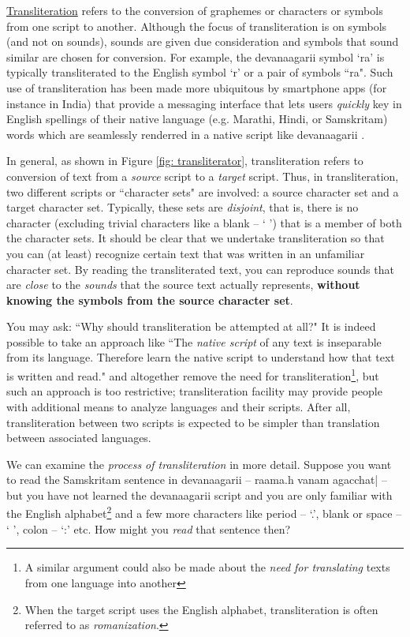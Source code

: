 \documentclass[a4paper, 12pt]{article}
\newcommand \sans[1]{
    \textsanskrit{#1}
}
\begin{document}
\href{https://en.m.wikipedia.org/wiki/Transliteration}{Transliteration} refers to the conversion of graphemes or characters or symbols from one script to another. Although the focus of transliteration is on symbols (and not on sounds), sounds are given due consideration and symbols that sound similar are chosen for conversion. For example, the \sans{devanaagarii} symbol \sans{`ra'} is typically transliterated to the English symbol `r' or a pair of symbols ``ra". Such use of transliteration has been made more ubiquitous by smartphone apps (for instance in India) that provide a messaging interface that lets users \emph{quickly} key in English spellings of their native language (e.g. Marathi, Hindi, or Samskritam) words which are seamlessly renderred in a native script like \sans{devanaagarii}. 

In general, as shown in Figure \ref{fig: transliterator}, transliteration refers to conversion of text from a \emph{source} script to a \emph{target} script. Thus, in transliteration, two different scripts or ``character sets" are involved: a source character set and a target character set. Typically, these sets are \emph{disjoint}, that is, there is no character (excluding trivial characters like a blank -- ` ') that is a member of both the character sets. It should be clear that we undertake transliteration so that you can (at least) recognize certain text that was written in an unfamiliar character set. By reading the transliterated text, you can reproduce sounds that are \emph{close} to the \emph{sounds} that the source text actually represents, \textbf{without knowing the symbols from the source character set}. 

You may ask: ``Why should transliteration be attempted at all?" It is indeed possible to take an approach like ``The \emph{native script} of any text is inseparable from its language. Therefore learn the native script to understand how that text is written and read." and altogether remove the need for transliteration\footnote{A similar argument could also be made about the \emph{need for translating} texts from one language into another}, but such an approach is too restrictive; transliteration facility may provide people with additional means to analyze languages and their scripts. After all, transliteration between two scripts is expected to be simpler than translation between associated languages.

We can examine the \emph{process of transliteration} in more detail. Suppose you want to read the Samskritam sentence in \sans{devanaagarii} -- \sans{raama.h vanam agacchat|} -- but you have not learned the \sans{devanaagarii} script and you are only familiar with the English alphabet\footnote{When the target script uses the English alphabet, transliteration is often referred to as \emph{romanization}.} and a few more characters like period -- `.', blank or space -- ` ', colon -- `:' etc. How might you \emph{read} that sentence then? 
\end{document}
